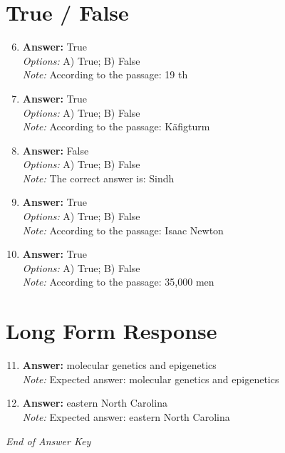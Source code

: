 \documentclass[12pt]{article}
\begin{document}
\section*{True / False}
\begin{enumerate}[label=\arabic*.]
\setcounter{enumi}{5}
\item \textbf{Answer:} True
\\ \textit{Options:} A) True; B) False
\\ \textit{Note:} According to the passage: 19 th
\item \textbf{Answer:} True
\\ \textit{Options:} A) True; B) False
\\ \textit{Note:} According to the passage: Käfigturm
\item \textbf{Answer:} False
\\ \textit{Options:} A) True; B) False
\\ \textit{Note:} The correct answer is: Sindh
\item \textbf{Answer:} True
\\ \textit{Options:} A) True; B) False
\\ \textit{Note:} According to the passage: Isaac Newton
\item \textbf{Answer:} True
\\ \textit{Options:} A) True; B) False
\\ \textit{Note:} According to the passage: 35,000 men
\end{enumerate}

\section*{Long Form Response}
\begin{enumerate}[label=\arabic*.]
\setcounter{enumi}{10}
\item \textbf{Answer:} molecular genetics and epigenetics
\\ \textit{Note:} Expected answer: molecular genetics and epigenetics
\item \textbf{Answer:} eastern North Carolina
\\ \textit{Note:} Expected answer: eastern North Carolina
\end{enumerate}

\vfill
\noindent\textit{End of Answer Key}
\end{document}
